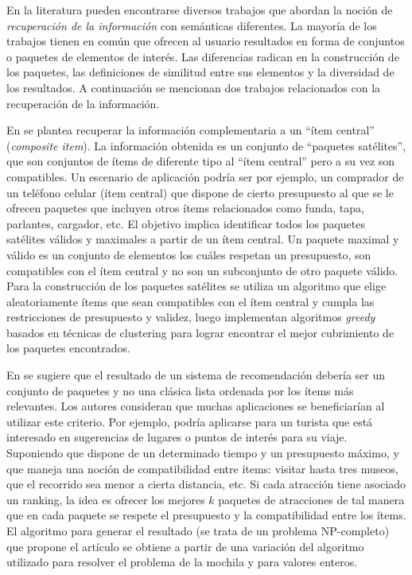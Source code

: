 En la literatura pueden encontrarse diversos trabajos que abordan la noción de \emph{recuperación de la información} con semánticas diferentes. La mayoría de los trabajos tienen en común que ofrecen al usuario resultados en forma de conjuntos o paquetes de elementos de interés. Las diferencias radican en la construcción de los paquetes, las definiciones de similitud entre sus elementos y la diversidad de los resultados. A continuación se mencionan dos trabajos relacionados con la recuperación de la información.

En \cite{BasuRoy:2010:CEC:1807167.1807258} se plantea recuperar la información complementaria a un ``ítem central'' (\textit{composite item}). La información obtenida es un conjunto de ``paquetes satélites'', que son conjuntos de ítems de diferente tipo al ``ítem central'' pero a su vez son compatibles. Un escenario de aplicación podría ser por ejemplo, un comprador de un teléfono celular (ítem central) que dispone de cierto presupuesto al que se le ofrecen paquetes que incluyen otros ítems relacionados como funda, tapa, parlantes, cargador, etc. El objetivo implica identificar todos los paquetes satélites válidos y maximales a partir de un ítem central. Un paquete maximal y válido es un conjunto de elementos los cuáles respetan un presupuesto, son compatibles con el ítem central y no son un subconjunto de otro paquete válido. Para la construcción de los paquetes satélites se utiliza un algoritmo que elige aleatoriamente ítems que sean compatibles con el ítem central y cumpla las restricciones de presupuesto y validez, luego implementan algoritmos \emph{greedy} basados en técnicas de clustering para lograr encontrar el mejor cubrimiento de los paquetes encontrados.

En \cite{Xie:2010:BOB:1864708.1864739} se sugiere que el resultado de un sistema de recomendación debería ser un conjunto de paquetes y no una clásica lista ordenada por los ítems más relevantes. Los autores consideran que muchas aplicaciones se beneficiarían al utilizar este criterio. Por ejemplo, podría aplicarse para un turista que está interesado en sugerencias de lugares o puntos de interés para su viaje. Suponiendo que dispone de un determinado tiempo y un presupuesto máximo, y que maneja una noción de compatibilidad entre ítems: visitar hasta tres museos, que el recorrido sea menor a cierta distancia, etc. Si cada atracción tiene asociado un ranking, la idea es ofrecer los mejores $k$ paquetes de atracciones de tal manera que en cada paquete se respete el presupuesto y la compatibilidad entre los ítems. El algoritmo para generar el resultado (se trata de un problema NP-completo) que propone el artículo se obtiene a partir de una variación del algoritmo utilizado para resolver el problema de la mochila \cite{DBLP:conf/coco/Karp72} y \cite{Gossett:2009:DMP:1717238} para valores enteros. 

